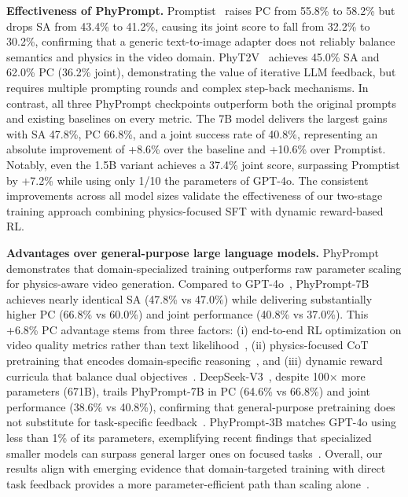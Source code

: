 \noindent \textbf{Effectiveness of PhyPrompt.}
Promptist~\cite{hao2023promptist} raises PC from 55.8\% to 58.2\% but drops SA from 43.4\% to 41.2\%, causing its joint score to fall from 32.2\% to 30.2\%, confirming that a generic text-to-image adapter does not reliably balance semantics and physics in the video domain. PhyT2V~\cite{xue2024phyt2v} achieves 45.0\% SA and 62.0\% PC (36.2\% joint), demonstrating the value of iterative LLM feedback, but requires multiple prompting rounds and complex step-back mechanisms. In contrast, all three PhyPrompt checkpoints outperform both the original prompts and existing baselines on every metric. The 7B model delivers the largest gains with SA 47.8\%, PC 66.8\%, and a joint success rate of 40.8\%, representing an absolute improvement of +8.6\% over the baseline and +10.6\% over Promptist. Notably, even the 1.5B variant achieves a 37.4\% joint score, surpassing Promptist by +7.2\% while using only 1/10 the parameters of GPT-4o. The consistent improvements across all model sizes validate the effectiveness of our two-stage training approach combining physics-focused SFT with dynamic reward-based RL.

\noindent\textbf{Advantages over general-purpose large language models.}
PhyPrompt demonstrates that domain-specialized training outperforms raw parameter scaling for physics-aware video generation. Compared to GPT-4o~\cite{achiam2023gpt-4o}, PhyPrompt-7B achieves nearly identical SA (47.8\% vs 47.0\%) while delivering substantially higher PC (66.8\% vs 60.0\%) and joint performance (40.8\% vs 37.0\%). This +6.8\% PC advantage stems from three factors: (i) end-to-end RL optimization on video quality metrics rather than text likelihood~\cite{ouyang2022training}, (ii) physics-focused CoT pretraining that encodes domain-specific reasoning~\cite{wei2022chain}, and (iii) dynamic reward curricula that balance dual objectives~\cite{bengio2009curriculum}. DeepSeek-V3~\cite{liu2024deepseek-v3}, despite 100× more parameters (671B), trails PhyPrompt-7B in PC (64.6\% vs 66.8\%) and joint performance (38.6\% vs 40.8\%), confirming that general-purpose pretraining does not substitute for task-specific feedback~\cite{hoffmann2022training}. PhyPrompt-3B matches GPT-4o using less than 1\% of its parameters, exemplifying recent findings that specialized smaller models can surpass general larger ones on focused tasks~\cite{muennighoff2023scaling}. Overall, our results align with emerging evidence that domain-targeted training with direct task feedback provides a more parameter-efficient path than scaling alone~\cite{kaplan2020scaling,wei2022emergent}.



